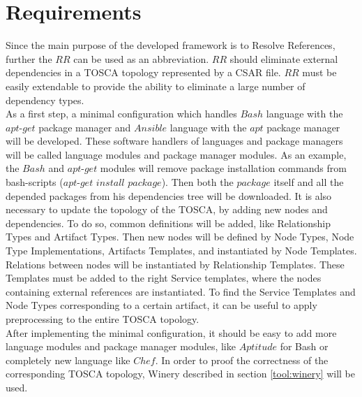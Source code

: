 
\chapter{Requirements}
\label{chap:req}
Since the main purpose of the developed framework is to Resolve References, further the $RR$ can be used as an abbreviation. 
$RR$ should eliminate external dependencies in a TOSCA topology represented by a CSAR file.
$RR$ must be easily extendable to provide the ability to eliminate a large number of dependency types.\\
As a first step, a minimal configuration which handles $Bash$ language with the $apt$-$get$ package manager and $Ansible$ language with the $apt$ package manager will be developed. 
These software handlers of languages and package managers will be called language modules and package manager modules.
As an example, the $Bash$ and $apt$-$get$ modules will remove package installation commands from bash-scripts ($apt$-$get$ $install$ \textbf{$package$}).
Then both the \textbf{$package$} itself and all the depended packages from his dependencies tree will be downloaded.
It is also necessary to update the topology of the TOSCA, by adding new nodes and dependencies.
To do so, common definitions will be added, like Relationship Types and Artifact Types.
Then new nodes will be defined by Node Types, Node Type Implementations, Artifacts Templates, and instantiated by Node Templates. 
Relations between nodes will be instantiated by Relationship Templates.
These Templates must be added to the right Service templates, where the nodes containing external references are instantiated.
To find the Service Templates and Node Types corresponding to a certain artifact, it can be useful to apply preprocessing to the entire TOSCA topology. \\
After implementing the minimal configuration, it should be easy to add more language modules and package manager modules, like $Aptitude$ for Bash or completely new language like $Chef$.
In order to proof the correctness of the corresponding TOSCA topology, Winery described in section \ref{tool:winery} will be used.
